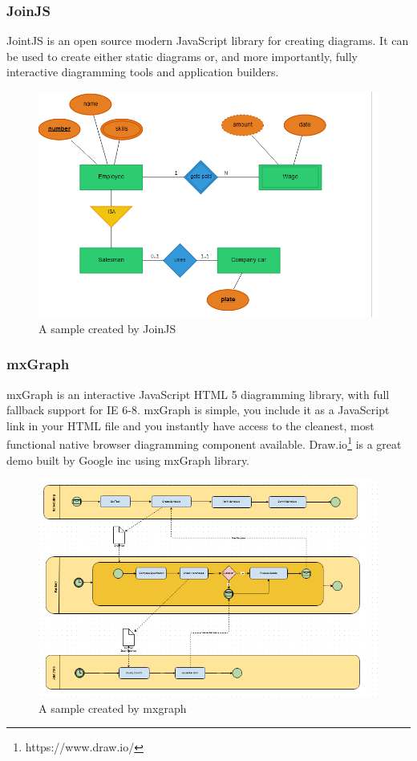 \documentclass[14pt,a4paper]{extreport}
\begin{document}
			\subsubsection{JoinJS}
 				JointJS is an open source modern JavaScript library for creating diagrams. It can be used to create either static diagrams or, and more importantly, fully interactive diagramming tools and application builders.
 				\begin{figure}[ht]
 					\begin{center}
 						\includegraphics[scale=0.5]{joinjs.png}
 						\caption{A sample created by JoinJS}
 					\end{center}
 				\end{figure}
 			\subsubsection{mxGraph}
 			mxGraph is an interactive JavaScript HTML 5 diagramming library, with full fallback support for IE 6-8. mxGraph is simple, you include it as a JavaScript link in your HTML file and you instantly have access to the cleanest, most functional native browser diagramming component available. Draw.io\footnote{https://www.draw.io/} is a great demo built by Google inc using mxGraph library.
 				\begin{figure}[ht]
 					\begin{center}
 						\includegraphics[scale=0.5]{mxgraph.png}
 						\caption{A sample created by mxgraph}
 					\end{center}
 				\end{figure}
\end{document}
